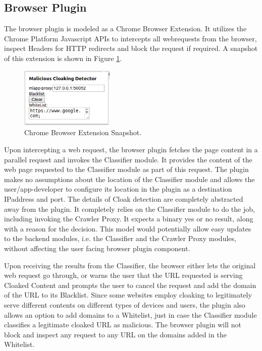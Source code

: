 \documentclass[letterpaper,twocolumn,10pt]{article}
\begin{document}
\subsection{Browser Plugin}

The browser plugin is modeled as a Chrome Browser Extension. It utilizes the Chrome Platform Javascript APIs to intercepts all webrequests from the browser, inspect Headers for HTTP redirects and block the request if required. A snapshot of this extension is shown in Figure \ref{fig:plugin}.

\begin{figure}[t]
  \centering
  \includegraphics[width=0.4\textwidth]{./proj_plugin.png}
  \caption{Chrome Browser Extension Snapshot.}
  \label{fig:plugin}
\end{figure}

Upon intercepting a web request, the browser plugin fetches the page content in a parallel request and invokes the Classifier module. It provides the content of the web page requested to the Classifier module as part of this request. The plugin makes no assumptions about the location of the Classifier module and allows the user/app-developer to configure its location in the plugin as a destination IPaddress and port. The details of Cloak detection are completely abstracted away from the plugin. It completely relies on the Classifier module to do the job, including invoking the Crawler Proxy. It expects a binary yes or no result, along with a reason for the decision. This model would potentially allow easy updates to the backend modules, i.e. the Classifier and the Crawler Proxy modules, without affecting the user facing browser plugin component.

Upon receiving the results from the Classifier, the browser either lets the original web request go through, or warns the user that the URL requested is serving Cloaked Content and prompts the user to cancel the request and add the domain of the URL to its Blacklist. Since some websites employ cloaking to legitimately serve different contents on different types of devices and users, the plugin also allows an option to add domains to a Whitelist, just in case the Classifier module classifies a legitimate cloaked URL as malicious. The browser plugin will not block and inspect any request to any URL on the domains added in the Whitelist.
\end{document}
